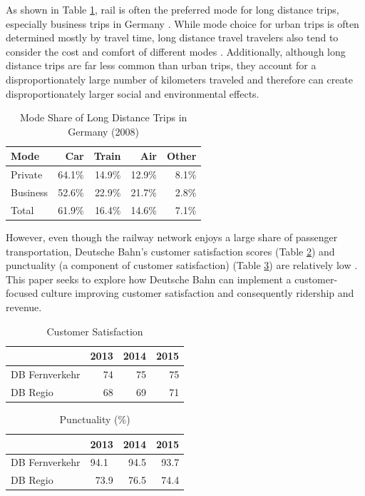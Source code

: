 \documentclass{article}
\begin{document}
As shown in Table \ref{table:modeshare}, rail is often the preferred mode for long distance trips, especially business trips in Germany \citep[Page 97]{reichert2015}. While mode choice for urban trips is often determined mostly by travel time, long distance travel travelers also tend to consider the cost and comfort of different modes \citep[Page 8-12]{moeckel2015}. Additionally, although long distance trips are far less common than urban trips, they account for a disproportionately large number of kilometers traveled and therefore can create disproportionately larger social and environmental effects.

\begin{table}[H]
  \centering
\begin{tabular}{ l | r r r r }
    Mode & Car & Train & Air & Other \\
    \hline
    Private & 64.1\% & 14.9\% & 12.9\% & 8.1\% \\
    Business & 52.6\% & 22.9\% & 21.7\% & 2.8\% \\
    Total & 61.9\% & 16.4\% & 14.6\% & 7.1\% \\
\end{tabular}
    \caption{Mode Share of Long Distance Trips in Germany (2008) \citep[Page 97]{reichert2015}}
    \label{table:modeshare}
\end{table}

However, even though the railway network enjoys a large share of passenger transportation, Deutsche Bahn's customer satisfaction scores (Table \ref{table:customerservice}) and punctuality (a component of customer satisfaction) (Table \ref{table:punctuality}) are relatively low \citep{db2016}. This paper seeks to explore how Deutsche Bahn can implement a customer-focused culture improving customer satisfaction and consequently ridership and revenue. 

\begin{table}[H]
  \centering
\begin{tabular}{ l | r | r | r }
 & 2013 & 2014 & 2015 \\
\hline
DB Fernverkehr & 74 & 75 & 75 \\
DB Regio & 68 & 69 & 71 \\
\end{tabular}
    \caption{Customer Satisfaction \citep{db2016}}
    \label{table:customerservice}
\end{table}

\begin{table}[H]
  \centering
\begin{tabular}{ l | r | r | r }
 & 2013 & 2014 & 2015 \\
\hline
DB Fernverkehr & 94.1\ & 94.5 & 93.7 \\
DB Regio & 73.9 & 76.5 & 74.4 \\
\end{tabular}
    \caption{Punctuality (\%) \citep{db2016}}
    \label{table:punctuality}
\end{table}
\end{document}
